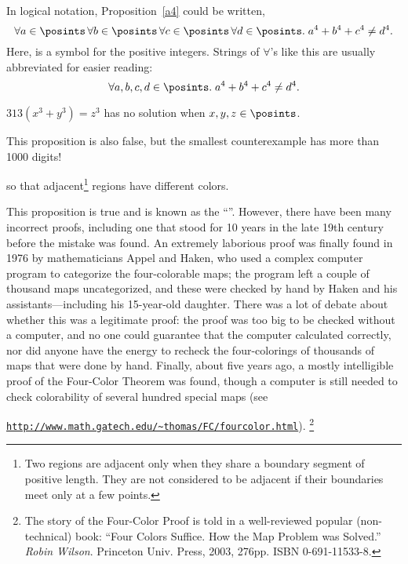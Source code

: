 In logical notation, Proposition~\ref{a4} could be written,
\[
\forall a \in \posints\, \forall b \in \posints\, \forall c \in \posints\, \forall
d \in \posints.\; a^4 + b^4 + c^4 \neq d^4.
\]
Here, \term{$\posints$} is a symbol for the positive integers.
Strings of $\forall$'s like this are usually abbreviated for easier reading:
\[
\forall a, b, c, d \in \posints.\; a^4 + b^4 + c^4 \neq d^4.
\]


\begin{proposition}
$313 (x^3 + y^3) = z^3$ has no solution when $x, y, z\in\posints$.
\end{proposition}

This proposition is also false, but the smallest counterexample has
more than 1000 digits!

\begin{proposition}\label{4colorprop}
 so that
adjacent\footnote{Two regions are adjacent only when they share a boundary
segment of positive length.  They are not considered to be adjacent if
their boundaries meet only at a few points.} regions have different
colors.
\end{proposition}

This proposition is true and is known as the ``''.
However, there have been many incorrect proofs, including one that stood
for 10 years in the late 19th century before the mistake was found.  An
extremely laborious proof was finally found in 1976 by mathematicians
Appel and Haken, who used a complex computer program to categorize the
four-colorable maps; the program left a couple of thousand maps
uncategorized, and these were checked by hand by Haken and his
assistants---including his 15-year-old daughter.  There was a lot of
debate about whether this was a legitimate proof: the proof was too big to
be checked without a computer, and no one could guarantee that the
computer calculated correctly, nor did anyone have the energy to recheck
the four-colorings of thousands of maps that were done by hand.  Finally,
about five years ago, a mostly intelligible proof of the Four-Color
Theorem was found, though a computer is still needed to check colorability
of several hundred special maps (see

\href{http://www.math.gatech.edu/~thomas/FC/fourcolor.html}
{\texttt{http://www.math.gatech.edu/\~{}thomas/FC/fourcolor.html}}).
\footnote{The story of the Four-Color Proof is told in a well-reviewed
  popular (non-technical) book: ``Four Colors Suffice.  How the Map
  Problem was Solved.'' \emph{Robin Wilson}.  Princeton Univ. Press, 2003,
  276pp. ISBN 0-691-11533-8.}

